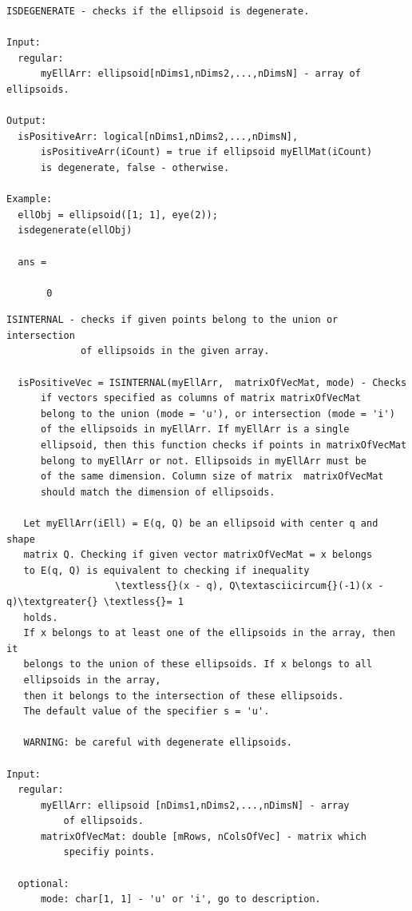 \documentclass[letterpaper,10pt,english]{sphinxmanual}
\begin{document}
\begin{Verbatim}[commandchars=\\\{\}]
ISDEGENERATE - checks if the ellipsoid is degenerate.

Input:
  regular:
      myEllArr: ellipsoid[nDims1,nDims2,...,nDimsN] - array of ellipsoids.

Output:
  isPositiveArr: logical[nDims1,nDims2,...,nDimsN],
      isPositiveArr(iCount) = true if ellipsoid myEllMat(iCount)
      is degenerate, false - otherwise.

Example:
  ellObj = ellipsoid([1; 1], eye(2));
  isdegenerate(ellObj)

  ans =

       0
\end{Verbatim}

\begin{Verbatim}[commandchars=\\\{\}]
ISINTERNAL - checks if given points belong to the union or intersection
             of ellipsoids in the given array.

  isPositiveVec = ISINTERNAL(myEllArr,  matrixOfVecMat, mode) - Checks
      if vectors specified as columns of matrix matrixOfVecMat
      belong to the union (mode = 'u'), or intersection (mode = 'i')
      of the ellipsoids in myEllArr. If myEllArr is a single
      ellipsoid, then this function checks if points in matrixOfVecMat
      belong to myEllArr or not. Ellipsoids in myEllArr must be
      of the same dimension. Column size of matrix  matrixOfVecMat
      should match the dimension of ellipsoids.

   Let myEllArr(iEll) = E(q, Q) be an ellipsoid with center q and shape
   matrix Q. Checking if given vector matrixOfVecMat = x belongs
   to E(q, Q) is equivalent to checking if inequality
                   \textless{}(x - q), Q\textasciicircum{}(-1)(x - q)\textgreater{} \textless{}= 1
   holds.
   If x belongs to at least one of the ellipsoids in the array, then it
   belongs to the union of these ellipsoids. If x belongs to all
   ellipsoids in the array,
   then it belongs to the intersection of these ellipsoids.
   The default value of the specifier s = 'u'.

   WARNING: be careful with degenerate ellipsoids.

Input:
  regular:
      myEllArr: ellipsoid [nDims1,nDims2,...,nDimsN] - array
          of ellipsoids.
      matrixOfVecMat: double [mRows, nColsOfVec] - matrix which
          specifiy points.

  optional:
      mode: char[1, 1] - 'u' or 'i', go to description.


\end{Verbatim}
\end{document}
